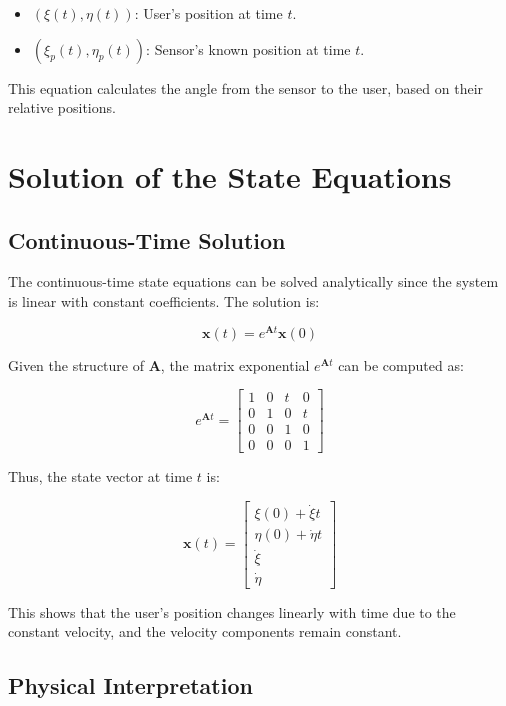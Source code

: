 \documentclass[12pt]{article}
\begin{document}
\begin{itemize}
    \item \( (\xi(t), \eta(t)) \): User's position at time \( t \).
    \item \( (\xi_p(t), \eta_p(t)) \): Sensor's known position at time \( t \).
\end{itemize}

This equation calculates the angle from the sensor to the user, based on their relative positions.

\section{Solution of the State Equations}

\subsection{Continuous-Time Solution}

The continuous-time state equations can be solved analytically since the system is linear with constant coefficients. The solution is:

\[
\mathbf{x}(t) = e^{\mathbf{A} t} \mathbf{x}(0)
\]

Given the structure of \( \mathbf{A} \), the matrix exponential \( e^{\mathbf{A} t} \) can be computed as:

\[
e^{\mathbf{A} t} = \begin{bmatrix}
1 & 0 & t & 0 \\
0 & 1 & 0 & t \\
0 & 0 & 1 & 0 \\
0 & 0 & 0 & 1
\end{bmatrix}
\]

Thus, the state vector at time \( t \) is:

\[
\mathbf{x}(t) = \begin{bmatrix}
\xi(0) + \dot{\xi} t \\
\eta(0) + \dot{\eta} t \\
\dot{\xi} \\
\dot{\eta}
\end{bmatrix}
\]

This shows that the user's position changes linearly with time due to the constant velocity, and the velocity components remain constant.

\subsection{Physical Interpretation}
\end{document}
